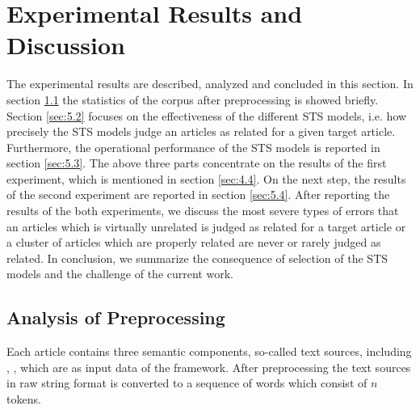 
\section{Experimental Results and Discussion}
\label{sec:5}

The experimental results are described, analyzed and concluded in this section. In section \ref{sec:5.1} the statistics of the corpus after preprocessing is showed briefly. Section \ref{sec:5.2} focuses on the effectiveness of the different STS models, i.e. how precisely the STS models judge an articles as related for a given target article. Furthermore, the operational performance of the STS models is reported in section \ref{sec:5.3}. The above three parts concentrate on the results of the first experiment, which is mentioned in section \ref{sec:4.4}. On the next step, the results of the second experiment are reported in section \ref{sec:5.4}. After reporting the results of the both experiments, we discuss the most severe types of errors that an articles which is virtually unrelated is judged as related for a target article or a cluster of articles which are properly related are never or rarely judged as related. In conclusion, we summarize the consequence of selection of the STS models and the challenge of the current work. 

\subsection{Analysis of Preprocessing}
\label{sec:5.1}

Each article contains three semantic components, so-called text sources, including \icontent{}, \ititle{}, \isummary{} which are as input data of the framework. After preprocessing the text sources in raw string format is converted to a sequence of words which consist of $n$ tokens. 

